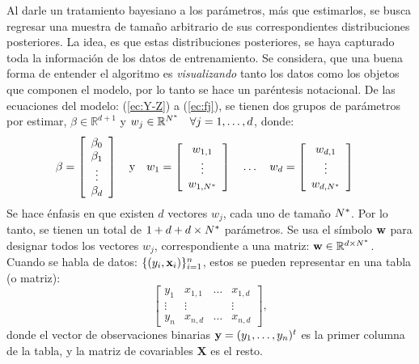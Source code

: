 \documentclass[../Main/Main.tex]{subfiles}
\begin{document}
Al darle un tratamiento bayesiano a los parámetros, más que estimarlos, se busca regresar una muestra de tamaño arbitrario de sus correspondientes distribuciones posteriores. La idea, es que estas distribuciones posteriores, se haya capturado toda la información de los datos de entrenamiento. Se considera, que una buena forma de entender el algoritmo es \textit{visualizando} tanto los datos como los objetos que componen el modelo, por lo tanto se hace un paréntesis notacional. De las ecuaciones del modelo: (\ref{ec:Y-Z}) a (\ref{ec:fj}), se tienen dos grupos de parámetros por estimar, $\beta \in \mathbb{R}^{d+1}$ y $w_j \in \mathbb{R}^{N^*} \quad \forall j = 1,\ldots,d$, donde:
\begin{align*}
\beta &= 
\left[ 
	\begin{array}{c}
	\beta_0 \\
	\beta_1 \\ 
	\vdots \\
	\beta_d
	\end{array}\right]
\quad \text{y} \quad 
w_1 = 
\left[ 
	\begin{array}{c}
	w_{1,1}\\
	\vdots\\
	w_{1,N^*}
	\end{array}\right]
\quad \ldots \quad 
w_d = 
\left[ 
	\begin{array}{c}
	w_{d,1}\\
	\vdots\\
	w_{d,N^*}
	\end{array}\right]
\end{align*}
Se hace énfasis en que existen $d$ vectores $w_j$, cada uno de tamaño $N^*$. Por lo tanto, se tienen un total de $1 + d + d\times N^*$ parámetros. Se usa el símbolo $\mathbf{w}$ para designar todos los vectores $w_j$, correspondiente a una matriz: $\mathbf{w}\in\mathbb{R}^{d\times N^*}$. Cuando se habla de datos: $\{(y_i,\mathbf{x}_i)\}_{i = 1}^n$, estos se pueden  representar en una tabla (o matriz):
$$\left[\begin{array}{c|ccc} 
y_1 & x_{1,1} & \ldots & x_{1,d} \\ 
\vdots & \vdots & ~ & \vdots \\ 
y_n & x_{n,d} & \ldots & x_{n,d}
\end{array}\right],$$
donde el vector de observaciones binarias $\mathbf{y} = (y_1,\ldots,y_n)^t$ es la primer columna de la tabla, y la matriz de covariables $\mathbf{X}$ es el resto.
\end{document}
